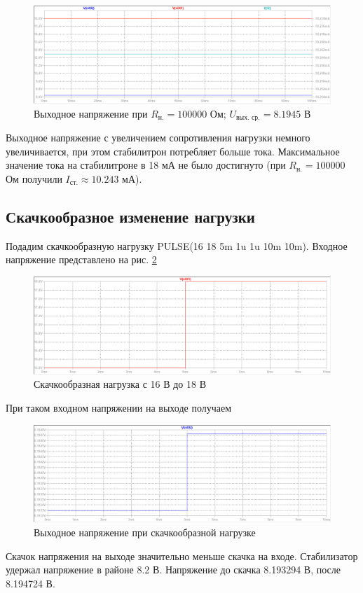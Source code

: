 \documentclass[a4paper, 12pt]{article}
\begin{document}
    \begin{figure}[H]
        \centering
        \includegraphics[scale=0.46]{1task_R100k.png}
        \captionsetup{skip=0pt}
        \caption{Выходное напряжение при $R_{\text{н.}}=100000$ Ом; $U_{\text{вых. ср.}}=8.1945$ В}
        \label{fig:1task_R100k}
    \end{figure}
    \noindent Выходное напряжение с увеличением сопротивления нагрузки немного увеличивается,
    при этом стабилитрон потребляет больше тока. Максимальное значение тока на стабилитроне в 18 мА
    не было достигнуто (при $R_{\text{н.}}=100000$ Ом получили $I_{\text{ст.}}\approx10.243$ мА).


    \subsection{Скачкообразное изменение нагрузки}
    Подадим скачкообразную нагрузку PULSE(16 18 5m 1u 1u 10m 10m). Входное напряжение
    представлено на рис. \ref{fig:1task_rect_input0}
    \begin{figure}[H]
        \centering
        \includegraphics[scale=0.46]{1task_rect_input0.png}
        \captionsetup{skip=0pt}
        \caption{Скачкообразная нагрузка с 16 В до 18 В}
        \label{fig:1task_rect_input0}
    \end{figure}
    При таком входном напряжении на выходе получаем
    \begin{figure}[H]
        \centering
        \includegraphics[scale=0.46]{1task_rect.png}
        \captionsetup{skip=0pt}
        \caption{Выходное напряжение при скачкообразной нагрузке}
        \label{fig:1task_rect}
    \end{figure}
    \noindent Скачок напряжения на выходе значительно меньше скачка на входе. Стабилизатор
    удержал напряжение в районе 8.2 В. Напряжение до скачка 8.193294 В, после 8.194724 В.
\end{document}
